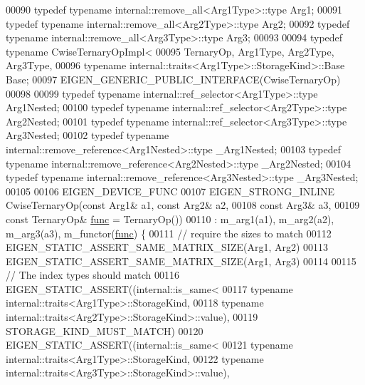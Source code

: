 \begin{DoxyCode}
00090   \textcolor{keyword}{typedef} \textcolor{keyword}{typename} internal::remove\_all<Arg1Type>::type Arg1;
00091   \textcolor{keyword}{typedef} \textcolor{keyword}{typename} internal::remove\_all<Arg2Type>::type Arg2;
00092   \textcolor{keyword}{typedef} \textcolor{keyword}{typename} internal::remove\_all<Arg3Type>::type Arg3;
00093 
00094   \textcolor{keyword}{typedef} \textcolor{keyword}{typename} CwiseTernaryOpImpl<
00095       TernaryOp, Arg1Type, Arg2Type, Arg3Type,
00096       \textcolor{keyword}{typename} internal::traits<Arg1Type>::StorageKind>::Base Base;
00097   EIGEN\_GENERIC\_PUBLIC\_INTERFACE(CwiseTernaryOp)
00098 
00099   \textcolor{keyword}{typedef} \textcolor{keyword}{typename} internal::ref\_selector<Arg1Type>::type Arg1Nested;
00100   \textcolor{keyword}{typedef} \textcolor{keyword}{typename} internal::ref\_selector<Arg2Type>::type Arg2Nested;
00101   \textcolor{keyword}{typedef} \textcolor{keyword}{typename} internal::ref\_selector<Arg3Type>::type Arg3Nested;
00102   \textcolor{keyword}{typedef} \textcolor{keyword}{typename} internal::remove\_reference<Arg1Nested>::type \_Arg1Nested;
00103   \textcolor{keyword}{typedef} \textcolor{keyword}{typename} internal::remove\_reference<Arg2Nested>::type \_Arg2Nested;
00104   \textcolor{keyword}{typedef} \textcolor{keyword}{typename} internal::remove\_reference<Arg3Nested>::type \_Arg3Nested;
00105 
00106   EIGEN\_DEVICE\_FUNC
00107   EIGEN\_STRONG\_INLINE CwiseTernaryOp(\textcolor{keyword}{const} Arg1& a1, \textcolor{keyword}{const} Arg2& a2,
00108                                      \textcolor{keyword}{const} Arg3& a3,
00109                                      \textcolor{keyword}{const} TernaryOp& \hyperlink{structfunc}{func} = TernaryOp())
00110       : m\_arg1(a1), m\_arg2(a2), m\_arg3(a3), m\_functor(\hyperlink{structfunc}{func}) \{
00111     \textcolor{comment}{// require the sizes to match}
00112     EIGEN\_STATIC\_ASSERT\_SAME\_MATRIX\_SIZE(Arg1, Arg2)
00113     EIGEN\_STATIC\_ASSERT\_SAME\_MATRIX\_SIZE(Arg1, Arg3)
00114 
00115     \textcolor{comment}{// The index types should match}
00116     EIGEN\_STATIC\_ASSERT((internal::is\_same<
00117                          \textcolor{keyword}{typename} internal::traits<Arg1Type>::StorageKind,
00118                          \textcolor{keyword}{typename} internal::traits<Arg2Type>::StorageKind>::value),
00119                         STORAGE\_KIND\_MUST\_MATCH)
00120     EIGEN\_STATIC\_ASSERT((internal::is\_same<
00121                          \textcolor{keyword}{typename} internal::traits<Arg1Type>::StorageKind,
00122                          \textcolor{keyword}{typename} internal::traits<Arg3Type>::StorageKind>::value),

\end{DoxyCode}
